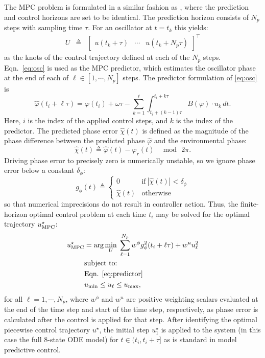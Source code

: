 The MPC problem is formulated in a similar fashion as \cite{Abel2016b}, where the prediction and control horizons are set to be identical.
The prediction horizon consists of $N_p$ steps with sampling time $\tau$.
For an oscillator at $t=t_k$ this yields:
\begin{eqnarray}
U&\triangleq& \begin{bmatrix} u(t_k+\tau) & \cdots & u\left(t_k+N_p\tau\right)
\end{bmatrix}^\top
\end{eqnarray}
as the knots of the control trajectory defined at each of the $N_p$ steps.
Eqn.~\eqref{eq:osc} is used as the MPC predictor, which estimates the oscillator phase at the end of each of $\ell\in[1,\cdots,N_p]$ steps.
The predictor formulation of \eqref{eq:osc} is
\begin{equation}\label{eq:discretephase6}
    \hat\varphi(t_i+\ell\tau) = \varphi(t_i) + \omega\tau -\sum_{k=1}^{\ell} \int_{t_{i}+(k-1)\tau}^{t_{i}+k\tau} B(\varphi)\cdot u_k\, dt.
\end{equation}
Here, $i$ is the index of the applied control steps, and $k$ is the index of the predictor.
The predicted phase error $\hat \chi(t)$ is defined as the magnitude of the phase difference between the predicted phase $\hat \varphi$ and the environmental phase:
\begin{equation}
    \label{eq:predictor}
        \hat{\chi}(t) \triangleq \hat\varphi(t)-\varphi_r(t) \,\,\,\mod\,2\pi.
\end{equation}
Driving phase error to precisely zero is numerically unstable, so we ignore phase error below a constant $\delta_\phi$:
\begin{equation}
    g_{\phi}(t)  \triangleq \begin{cases}
            0 & \text{if}\ |\hat\chi(t)|<\delta_\phi\\
            \hat\chi(t) & \text{otherwise}
        \end{cases}
 \end{equation}
so that numerical imprecisions do not result in controller action.
Thus, the finite-horizon optimal control problem at each time $t_i$ may be solved for the optimal trajectory $u^\star_{\rm MPC}$:
\begin{eqnarray}
    \nonumber  u^\star_{\rm MPC} &= \arg\min\limits_{U} \;\sum_{\ell=1}^{N_p} w^\phi g^2_{\phi}(t_i+\ell\tau) + w^u u_\ell^2\\
        \label{eq:mpcoptim6} &\text{subject to:}\\
        \nonumber &\text{Eqn. \eqref{eq:predictor}}\\
        \nonumber  &u_{\min} \le u_{\ell}\le u_{\max},
    \end{eqnarray}
for all $\ell=1, \cdots,N_p$, where $w^\phi$ and $w^u$ are positive weighting scalars evaluated at the end of the time step and start of the time step, respectively, as phase error is calculated after the control is applied for that step.
After identifying the optimal piecewise control trajectory $u^\star$, the initial step $u^\star_1$ is applied to the system (in this case the full 8-state ODE model) for $t \in (t_i, t_i+\tau]$ as is standard in model predictive control.

